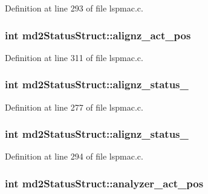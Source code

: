 Definition at line 293 of file lspmac.\-c.

\hypertarget{structmd2StatusStruct_a480f892fe91b05b2980fb00064807e2b}{
\subsubsection[{alignz\-\_\-act\-\_\-pos}]{\setlength{\rightskip}{0pt plus 5cm}int md2\-Status\-Struct\-::alignz\-\_\-act\-\_\-pos}}\label{structmd2StatusStruct_a480f892fe91b05b2980fb00064807e2b}


Definition at line 311 of file lspmac.\-c.

\hypertarget{structmd2StatusStruct_aadbfac5709de57e449a37e2937d6ade7}{
\subsubsection[{alignz\-\_\-status\-\_\-1}]{\setlength{\rightskip}{0pt plus 5cm}int md2\-Status\-Struct\-::alignz\-\_\-status\-\_}}\label{structmd2StatusStruct_aadbfac5709de57e449a37e2937d6ade7}


Definition at line 277 of file lspmac.\-c.

\hypertarget{structmd2StatusStruct_ac378da16eeaab2bc47f3f8f88f7411ed}{
\subsubsection[{alignz\-\_\-status\-\_\-2}]{\setlength{\rightskip}{0pt plus 5cm}int md2\-Status\-Struct\-::alignz\-\_\-status\-\_}}\label{structmd2StatusStruct_ac378da16eeaab2bc47f3f8f88f7411ed}


Definition at line 294 of file lspmac.\-c.

\hypertarget{structmd2StatusStruct_a49d1151b0e819646587be0ca9c9d612a}{
\subsubsection[{analyzer\-\_\-act\-\_\-pos}]{\setlength{\rightskip}{0pt plus 5cm}int md2\-Status\-Struct\-::analyzer\-\_\-act\-\_\-pos}}\label{structmd2StatusStruct_a49d1151b0e819646587be0ca9c9d612a}


